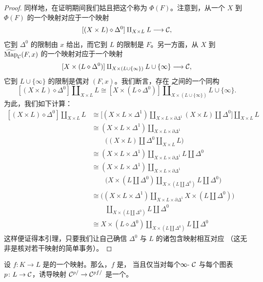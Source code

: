 \begin{proof}
同样地，在证明期间我们姑且把这个\trPullback{}称为 $\Phi(F)$。注意到，从一个%
\trSimplicialSet{} $X$ 到 $\Phi(F)$ 的一个映射对应于一个映射
\[
[(X \times L) \diamond \Delta^0] \amalg_{X \times L} L \longrightarrow \mathcal{C},
\]
它到 $\Delta^0$ 的限制由 $x$ 给出，而它到 $L$ 的限制是 $F$。另一方面，从 $X$ 到
$\widetilde{\mathrm{Map}}_{\mathcal{C}}(F, x)$ 的一个映射对应于一个映射
\[
[X \times (L \diamond \Delta^0)]
  \amalg_{X \times (L \cup \{\infty\})} L \cup \{\infty\}
  \longrightarrow \mathcal{C},
\]
它到 $L \cup \{\infty\}$ 的限制是偶对 $(F, x)$。我们断言，存在\trSimplicialSets{}%
之间的一个同构
\[
[(X \times L) \diamond \Delta^0] \amalg_{X \times L} L
  \cong [X \times (L \diamond \Delta^0)]
        \amalg_{X \times (L \cup \{\infty\})} L \cup \{\infty\}.
\]
为此，我们如下计算：
\[
\begin{aligned}
[(X \times L) \diamond \Delta^0] \amalg_{X \times L} L
&\cong \bigl[(X \times L \times \Delta^1)
  \amalg_{X \times L \times \partial\Delta^1} (X \times L) \amalg \Delta^0\bigr]
  \amalg_{X \times L} L \\
&\cong (X \times L \times \Delta^1)
  \amalg_{X \times L \times \partial\Delta^1} \\
&\qquad \bigl((X \times L) \amalg \Delta^0
  \amalg_{X \times L} L\bigr) \\
&\cong (X \times L \times \Delta^1)
  \amalg_{X \times L \times \partial\Delta^1} L \amalg \Delta^0 \\
&\cong (X \times L \times \Delta^1)
  \amalg_{X \times L \times \partial\Delta^1} \\
&\qquad \bigl(X \times (L \amalg \Delta^0)
  \amalg_{X \times (L \amalg \Delta^0)} L \amalg \Delta^0\bigr) \\
&\cong \bigl((X \times L \times \Delta^1)
  \amalg_{X \times L \times \partial\Delta^1} X \times (L \amalg \Delta^0)\bigr) \\
&\qquad \amalg_{X \times (L \amalg \Delta^0)} L \amalg \Delta^0 \\
&\cong X \times (L \diamond \Delta^0)
  \amalg_{X \times (L \amalg \Delta^0)} L \amalg \Delta^0
\end{aligned}
\]
这样便证得本引理，只要我们让自己确信 $\Delta^0$ 与 $L$ 的诸包含映射相互对应
（这无非是核对若干映射的简单事务）。
\end{proof}

\begin{theorem}\label{thm:cofinal-characterization}
设 $f\colon K \to L$ 是\trSimplicialSets{}的一个映射。那么，$f$ 是\trCofinal{}，
当且仅当对每个∞-\trCategory{} $\mathcal{C}$ 与每个图表 $p\colon L \to \mathcal{C}$，诱导映射
$\mathcal{C}^{p/} \to \mathcal{C}^{pf/}$ 是一个\trJoyalEquivalence{}。
\end{theorem}

